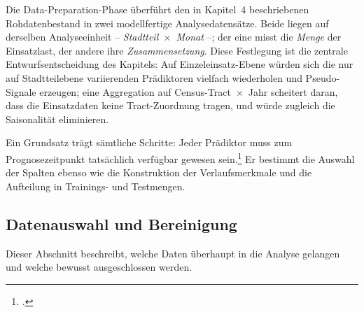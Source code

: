 \documentclass[12pt,a4paper]{article}
\begin{document}
Die Data-Preparation-Phase überführt den in Kapitel~4 beschriebenen
Rohdatenbestand in zwei modellfertige Analysedatensätze. Beide liegen auf
derselben Analyseeinheit -- \emph{Stadtteil~$\times$~Monat} --; der eine misst
die \emph{Menge} der Einsatzlast, der andere ihre \emph{Zusammensetzung}. Diese
Festlegung ist die zentrale Entwurfsentscheidung des Kapitels: Auf
Einzeleinsatz-Ebene würden sich die nur auf Stadtteilebene variierenden
Prädiktoren vielfach wiederholen und Pseudo-Signale erzeugen; eine Aggregation
auf Census-Tract~$\times$~Jahr scheitert daran, dass die Einsatzdaten keine
Tract-Zuordnung tragen, und würde zugleich die Saisonalität eliminieren.

Ein Grundsatz trägt sämtliche Schritte: Jeder Prädiktor muss zum
Prognosezeitpunkt tatsächlich verfügbar gewesen sein.\footcite[192-193]{Bergmeir2012}
Er bestimmt die Auswahl der Spalten ebenso wie die Konstruktion der
Verlaufsmerkmale und die Aufteilung in Trainings- und Testmengen.

\subsection{Datenauswahl und Bereinigung}
\label{sec:auswahl-bereinigung}

Dieser Abschnitt beschreibt, welche Daten überhaupt in die Analyse gelangen und
welche bewusst ausgeschlossen werden.
\end{document}
